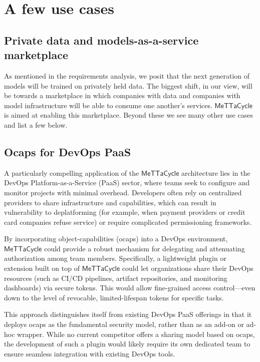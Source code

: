 \documentclass{article}
\newcommand{\MC}{\mathsf{MeTTaCycle}}
\begin{document}
\section{A few use cases}

\subsection{Private data and models-as-a-service marketplace}

As mentioned in the requirements analysis, we posit that the next
generation of models will be trained on privately held data. The
biggest shift, in our view, will be towards a marketplace in which
companies with data and companies with model infrastructure will be
able to consume one another's services. $\MC$ is aimed at enabling
this marketplace. Beyond these we see many other use cases and list a
few below.

\subsection{Ocaps for DevOps PaaS}

A particularly compelling application of the $\MC$ architecture lies in the DevOps Platform-as-a-Service (PaaS) sector, where teams seek to configure and monitor projects with minimal overhead. Developers often rely on centralized providers to share infrastructure and capabilities, which can result in vulnerability to deplatforming (for example, when payment providers or credit card companies refuse service) or require complicated permissioning frameworks.

By incorporating object-capabilities (ocaps) into a DevOps environment, $\MC$ could provide a robust mechanism for delegating and attenuating authorization among team members. Specifically, a lightweight plugin or extension built on top of $\MC$ could let organizations share their DevOps resources (such as CI/CD pipelines, artifact repositories, and monitoring dashboards) via secure tokens. This would allow fine-grained access control---even down to the level of revocable, limited-lifespan tokens for specific tasks.

This approach distinguishes itself from existing DevOps PaaS offerings in that it deploys ocaps as the fundamental security model, rather than as an add-on or ad-hoc wrapper. While no current competitor offers a sharing model based on ocaps, the development of such a plugin would likely require its own dedicated team to ensure seamless integration with existing DevOps tools.
\end{document}
